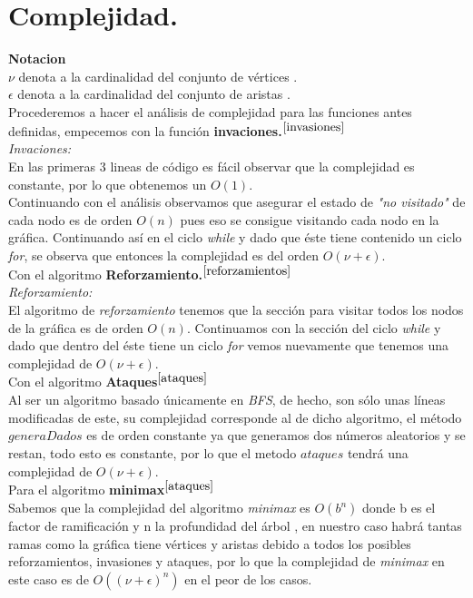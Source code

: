 \documentclass[12pt]{article}
\begin{document}
\section{Complejidad.}

\textbf{Notacion}\\
$\nu$ denota a la cardinalidad del conjunto de v\'ertices \cite{bondy1976graph}.\\
$\epsilon$ denota a la cardinalidad del conjunto de aristas \cite{bondy1976graph}.\\

Procederemos a hacer el an\'alisis de complejidad para las funciones antes definidas, empecemos con la funci\'on \textbf{invaciones.}$^{\ref{invasiones}}$\\
\textit{Invaciones:}\\
En las primeras 3 lineas de c\'odigo es f\'acil observar que la complejidad es constante, por lo que obtenemos un $O(1)$.\\
Continuando con el an\'alisis observamos que asegurar el estado de \textit{"no visitado"} de cada nodo es de orden $O(n)$ pues eso se consigue visitando cada nodo en la gr\'afica.
Continuando as\'i en el ciclo \textit{while} y dado que \'este tiene contenido un ciclo \textit{for}, se observa que entonces la 
complejidad es del orden $O (\nu + \epsilon)$.\\

Con el algoritmo \textbf{Reforzamiento.}$^{\ref{reforzamientos} }$\\
\textit{Reforzamiento:}\\
El algoritmo de \textit{reforzamiento} tenemos que la secci\'on para visitar todos los nodos de la gr\'afica es de orden $O(n)$.
Continuamos con la secci\'on del ciclo \textit{while} y dado que dentro del \'este tiene un ciclo \textit{for} vemos nuevamente que tenemos una complejidad de $O(\nu + \epsilon)$.\\

Con el algoritmo \textbf{Ataques}$^{\ref{ataques} }$\\
Al ser un algoritmo basado \'unicamente en \textit{BFS}, de hecho, son s\'olo unas l\'ineas modificadas de este, su complejidad
corresponde al de dicho algoritmo, el m\'etodo $generaDados$ es de orden constante ya que generamos dos n\'umeros aleatorios
y se restan, todo esto es constante, por lo que el metodo $ataques$ tendr\'a una complejidad de $O(\nu + \epsilon)$.\\

Para el algoritmo \textbf{minimax}$^{\ref{ataques} }$\\
Sabemos que la complejidad del algoritmo \textit{minimax} es $O(b^{n})$ donde b es el factor de ramificaci\'on y n la profundidad del 
\'arbol \cite{russell2004inteligencia}, en nuestro caso habr\'a tantas ramas como la gr\'afica tiene v\'ertices y aristas debido
a todos los posibles reforzamientos, invasiones y ataques, 
por lo que la complejidad de \textit{minimax} en este caso es de $O((\nu+\epsilon)^{n})$ en el peor de los casos.
\end{document}
